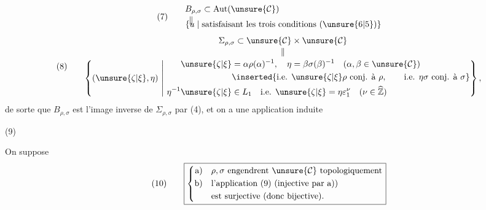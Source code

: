  
\[
(7)\qquad
\begin{aligned}
B_{\rho,\sigma}&\subset\mathrm{Aut}(\unsure{\mathcal{C}})\\[-2pt]
\Vert\quad&\\[-10pt]
\{u\mid{}&\text{satisfaisant les trois conditions }(\unsure{6|5})\}
\end{aligned}
\]
\[
(8)\qquad
\begin{gathered}
\Sigma_{\rho,\sigma}\subset\unsure{\mathcal{C}}\times\unsure{\mathcal{C}}\\[-2pt]
\Vert\\[-2pt]
\left\{(\unsure{\zeta|\xi},\eta)\ \middle|\ 
\begin{aligned}
\unsure{\zeta|\xi}&=\alpha\rho(\alpha)^{-1},\quad
\eta=\beta\sigma(\beta)^{-1}\quad(\alpha,\beta\in\unsure{\mathcal{C}})\\
&\inserted{\text{i.e. }\unsure{\zeta|\xi}\rho\text{ conj. à }\rho,\qquad\text{i.e. }\eta\sigma\text{ conj. à }\sigma}\\
\eta^{-1}\unsure{\zeta|\xi}&\in L_1\quad\text{i.e. }\unsure{\zeta|\xi}=\eta\varepsilon_1^\nu\quad(\nu\in\widehat{\mathbb Z})
\end{aligned}\right\},
\end{gathered}
\]
de sorte que $B_{\rho,\sigma}$ est l'image inverse de $\Sigma_{\rho,\sigma}$ par (4), et on a une application induite
\begin{samepage}
\diagram{\begin{tikzcd}
B_{\rho,\sigma}\arrow[r,"\varphi=\varphi_{\rho,\sigma}"]&\Sigma_{\rho,\sigma}.
\end{tikzcd}}\hfill(9)
\end{samepage}

On suppose
\[
(10)\qquad\boxed{\left\{\begin{aligned}
\text{a)}\quad&\rho,\sigma\text{ engendrent }\unsure{\mathcal{C}}\text{ topologiquement}\\
\text{b)}\quad&\text{l'application (9) (injective par a))}\\
&\text{est surjective (donc bijective).}
\end{aligned}\right.}
\]

